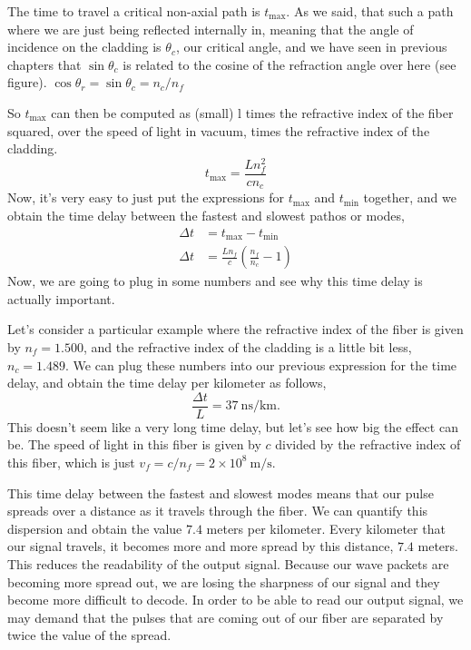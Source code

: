 The time to travel a critical non-axial path is $t_{\mathrm{max}}$. As we said, that such a path where we are just being reflected internally in, meaning that the angle of incidence on the cladding is $\theta_c$, our critical angle, and we have seen in previous chapters that $\sin{\theta_c}$ is related to the cosine of the refraction angle over here (see figure). $\cos \theta_r=\sin \theta_c=n_c / n_f$

So $t_{\mathrm{max}}$ can then be computed as (small) l times the refractive index of the fiber squared, over the speed of light in vacuum, times the refractive index of the cladding. 
\begin{equation}
t_{\max }=\frac{L n_f^2}{c n_c}
\end{equation}
Now, it's very easy to just put the expressions for $t_{\mathrm{max}}$ and $t_{\mathrm{min}}$ together, and we obtain the time delay between the fastest and slowest pathos or modes, 
\begin{equation}
\begin{aligned}
\Delta t &=t_{\max }-t_{\min } \\
\Delta t &=\frac{L n_f}{c}\left(\frac{n_f}{n_c}-1\right)
\end{aligned}
\end{equation}
Now, we are going to plug in some numbers and see why this time delay is actually important.

Let's consider a particular example where the refractive index of the fiber is given by $n_f = 1.500$, and the refractive index of the cladding is a little bit less, $n_c = 1.489$. We can plug these numbers into our previous expression for the time delay, and obtain the time delay per kilometer as follows,
\begin{equation}
\frac{\Delta t}{L}=37 \mathrm{~ns} / \mathrm{km}.
\end{equation}
This doesn't seem like a very long time delay, but let's see how big the effect can be. The speed of light in this fiber is given by $c$ divided by the refractive index of this fiber, which is just $v_f=c / n_f=2 \times 10^8 \mathrm{~m} / \mathrm{s}$.

This time delay between the fastest and slowest modes means that our pulse spreads over a distance as it travels through the fiber. We can quantify this dispersion and obtain the value $7.4$ meters per kilometer. Every kilometer that our signal travels, it becomes more and more spread by this distance, $7.4$ meters. This reduces the readability of the output signal. Because our wave packets are becoming more spread out, we are losing the sharpness of our signal and they become more difficult to decode. In order to be able to read our output signal, we may demand that the pulses that are coming out of our fiber are separated by twice the value of the spread.

